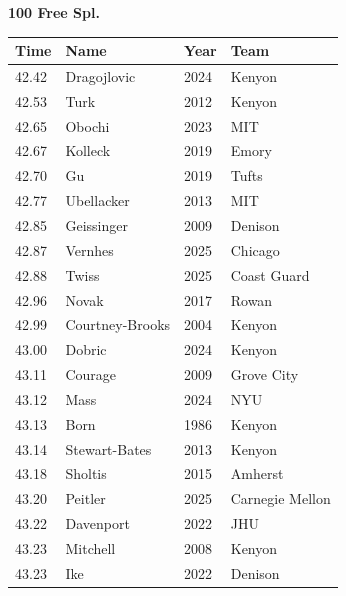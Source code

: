 \noindent\begin{minipage}[t]{0.98\textwidth}
\centering
\textbf{\textcolor{teamprimary}{100 Free Spl.}}\par
\vspace{0.5em}
\centering
\small
\renewcommand{\arraystretch}{1.0}
\setlength{\tabcolsep}{4pt}
\begin{tabular}{@{}p{2.5cm}p{4.5cm}p{1.5cm}p{2.5cm}@{}}
\toprule
\textbf{Time} & \textbf{Name} & \textbf{Year} & \textbf{Team} \\
\midrule
42.42 & Dragojlovic & 2024 & Kenyon \\
42.53 & Turk & 2012 & Kenyon \\
42.65 & Obochi & 2023 & MIT \\
42.67 & Kolleck & 2019 & Emory \\
42.70 & Gu & 2019 & Tufts \\
42.77 & Ubellacker & 2013 & MIT \\
42.85 & Geissinger & 2009 & Denison \\
42.87 & Vernhes & 2025 & Chicago \\
42.88 & Twiss & 2025 & Coast Guard \\
42.96 & Novak & 2017 & Rowan \\
42.99 & Courtney-Brooks & 2004 & Kenyon \\
43.00 & Dobric & 2024 & Kenyon \\
43.11 & Courage & 2009 & Grove City \\
43.12 & Mass & 2024 & NYU \\
43.13 & Born & 1986 & Kenyon \\
43.14 & Stewart-Bates & 2013 & Kenyon \\
43.18 & Sholtis & 2015 & Amherst \\
43.20 & Peitler & 2025 & Carnegie Mellon \\
43.22 & Davenport & 2022 & JHU \\
43.23 & Mitchell & 2008 & Kenyon \\
43.23 & Ike & 2022 & Denison \\
\bottomrule
\end{tabular}
\end{minipage}
\vspace{1.2em}

